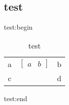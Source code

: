 
\begin{issues}
\issueDraft
\end{issues}


\subsection{test}
test:begin

\begin{table}[ht]
\caption{test}
\begin{tabular}{c|c|c}
a & $\begin{bmatrix}
	a & b
\end{bmatrix}$ & b \\
c & & d
\end{tabular}
\end{table}

test:end